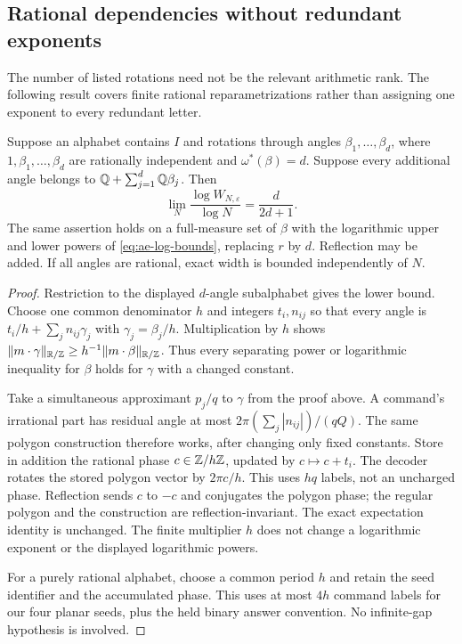 \subsection{Rational dependencies without redundant exponents}
The number of listed rotations need not be the relevant arithmetic rank. The following result covers finite rational reparametrizations rather than assigning one exponent to every redundant letter.

\begin{corollary}\label{cor:rational-extension}
Suppose an alphabet contains $I$ and rotations through angles $\beta_1,\ldots,\beta_d$, where $1,\beta_1,\ldots,\beta_d$ are rationally independent and $\omega^*(\beta)=d$. Suppose every additional angle belongs to $\mathbb Q+\sum_{j=1}^d\mathbb Q\beta_j$. Then
\[
       \lim_N\frac{\log W_{N,\varepsilon}}{\log N}=\frac{d}{2d+1}.
\]
The same assertion holds on a full-measure set of $\beta$ with the logarithmic upper and lower powers of \eqref{eq:ae-log-bounds}, replacing $r$ by $d$. Reflection may be added. If all angles are rational, exact width is bounded independently of $N$.
\end{corollary}
\begin{proof}
Restriction to the displayed $d$-angle subalphabet gives the lower bound. Choose one common denominator $h$ and integers $t_i,n_{ij}$ so that every angle is
$t_i/h+\sum_jn_{ij}\gamma_j$ with $\gamma_j=\beta_j/h$. Multiplication by $h$ shows
$\lVert m\cdot\gamma\rVert_{\mathbb R/\mathbb Z}\ge h^{-1}\lVert m\cdot\beta\rVert_{\mathbb R/\mathbb Z}$.
Thus every separating power or logarithmic inequality for $\beta$ holds for $\gamma$ with a changed constant.

Take a simultaneous approximant $p_j/q$ to $\gamma$ from the proof above. A command's irrational part has residual angle at most
$2\pi(\sum_j|n_{ij}|)/(qQ)$. The same polygon construction therefore works, after changing only fixed constants. Store in addition the rational phase $c\in\mathbb Z/h\mathbb Z$, updated by $c\mapsto c+t_i$. The decoder rotates the stored polygon vector by $2\pi c/h$. This uses $hq$ labels, not an uncharged phase. Reflection sends $c$ to $-c$ and conjugates the polygon phase; the regular polygon and the construction are reflection-invariant. The exact expectation identity is unchanged. The finite multiplier $h$ does not change a logarithmic exponent or the displayed logarithmic powers.

For a purely rational alphabet, choose a common period $h$ and retain the seed identifier and the accumulated phase. This uses at most $4h$ command labels for our four planar seeds, plus the held binary answer convention. No infinite-gap hypothesis is involved.
\end{proof}
